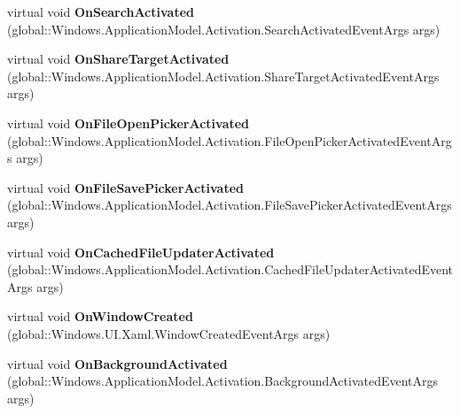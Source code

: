 \begin{DoxyCompactItemize}
\item 
\mbox{\label{class_windows_1_1_u_i_1_1_xaml_1_1_application_a361d968000b09b19ff4e794b6550ff86}} 
virtual void {\bfseries On\+Search\+Activated} (global\+::\+Windows.\+Application\+Model.\+Activation.\+Search\+Activated\+Event\+Args args)
\item 
\mbox{\label{class_windows_1_1_u_i_1_1_xaml_1_1_application_a9281a10e995bfc3ce84c4732cd139856}} 
virtual void {\bfseries On\+Share\+Target\+Activated} (global\+::\+Windows.\+Application\+Model.\+Activation.\+Share\+Target\+Activated\+Event\+Args args)
\item 
\mbox{\label{class_windows_1_1_u_i_1_1_xaml_1_1_application_a6349d39f9b31d3d870acad8ce929f8cb}} 
virtual void {\bfseries On\+File\+Open\+Picker\+Activated} (global\+::\+Windows.\+Application\+Model.\+Activation.\+File\+Open\+Picker\+Activated\+Event\+Args args)
\item 
\mbox{\label{class_windows_1_1_u_i_1_1_xaml_1_1_application_ac08cc52e93ef57a27360f3cb1ae256c4}} 
virtual void {\bfseries On\+File\+Save\+Picker\+Activated} (global\+::\+Windows.\+Application\+Model.\+Activation.\+File\+Save\+Picker\+Activated\+Event\+Args args)
\item 
\mbox{\label{class_windows_1_1_u_i_1_1_xaml_1_1_application_a7f572e2107540b33cb772a84ddd7ec72}} 
virtual void {\bfseries On\+Cached\+File\+Updater\+Activated} (global\+::\+Windows.\+Application\+Model.\+Activation.\+Cached\+File\+Updater\+Activated\+Event\+Args args)
\item 
\mbox{\label{class_windows_1_1_u_i_1_1_xaml_1_1_application_a69d851136f5764f6fb1d953b4447219f}} 
virtual void {\bfseries On\+Window\+Created} (global\+::\+Windows.\+U\+I.\+Xaml.\+Window\+Created\+Event\+Args args)
\item 
\mbox{\label{class_windows_1_1_u_i_1_1_xaml_1_1_application_a99448e12dcdd4516781f0aba248db35e}} 
virtual void {\bfseries On\+Background\+Activated} (global\+::\+Windows.\+Application\+Model.\+Activation.\+Background\+Activated\+Event\+Args args)

\end{DoxyCompactItemize}

